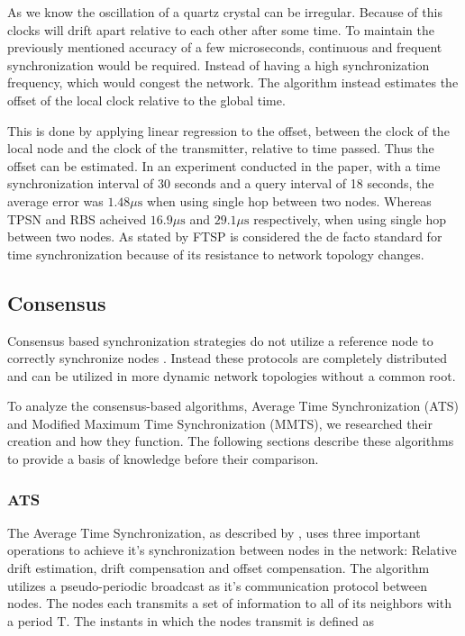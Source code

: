 \documentclass[a4paper,12pt]{article}
\begin{document}
    
    As we know the oscillation of a quartz crystal can be irregular. Because of this clocks will drift apart relative to each other after some time. To maintain the previously mentioned accuracy of a few microseconds, continuous and frequent synchronization would be required. Instead of having a high synchronization frequency, which would congest the network. The algorithm instead estimates the offset of the local clock relative to the global time. 
    
    
    This is done by applying linear regression to the offset, between the clock of the local node and the clock of the transmitter, relative to time passed. Thus the offset can be estimated. In an experiment conducted in the paper, with a time synchronization interval of 30 seconds and a query interval of 18 seconds, the average error was $1.48 \mu \text{s}$ when using single hop between two nodes. Whereas TPSN and RBS acheived $16.9 \mu \text{s}$ and $29.1 \mu \text{s}$ respectively, when using single hop between two nodes. As stated by \citet{LucaFiorentin11} FTSP is considered the de facto standard for time synchronization because of its resistance to network topology changes.   
    
    
    \subsection{Consensus}
    Consensus based synchronization strategies do not utilize a reference node to correctly synchronize nodes \citep{HeLiChenCheng13}. Instead these protocols are completely distributed and can be utilized in more dynamic network topologies without a common root.
    
    To analyze the consensus-based algorithms, Average Time Synchronization (ATS) and Modified Maximum Time Synchronization (MMTS), we researched their creation and how they function. The following sections describe these algorithms to provide a basis of knowledge before their comparison.
    
    \subsubsection{ATS} The Average Time Synchronization, as described by \citet{LucaFiorentin11}, uses three important operations to achieve it's synchronization between nodes in the network: Relative drift estimation, drift compensation and offset compensation. The algorithm utilizes a pseudo-periodic broadcast as it's communication protocol between nodes. The nodes each transmits a set of information to all of its neighbors with a period $\mathrm{T}$. The instants in which the nodes transmit is defined as 
    
\end{document}
